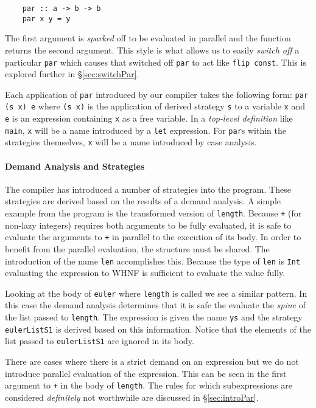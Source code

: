 \begin{verbatim}
    par :: a -> b -> b
    par x y = y
\end{verbatim}

The first argument is \emph{sparked} off to be evaluated in parallel and the
function returns the second argument. This style is what allows us to easily
\emph{switch off} a particular \verb-par- which causes that switched off
\verb-par- to act like \verb-flip const-. This is explored further in
\S\ref{sec:switchPar}.

Each application of \verb-par- introduced by our compiler takes the following
form: \verb-par (s x) e- where \verb-(s x)- is the application of derived
strategy \verb-s- to a variable \verb$x$ and \verb$e$ is an expression containing \verb$x$ as a
free variable.  In a \emph{top-level definition} like \verb-main-, \verb$x$ will be a
name introduced by a \verb-let- expression. For \verb-par-s within the
strategies themselves, \verb$x$ will be a name introduced by case analysis.

\paragraph{Demand Analysis and Strategies}

The compiler has introduced a number of strategies into the program. These
strategies are derived based on the results of a demand analysis. A simple
example from the program is the transformed version of \verb-length-. Because
\verb-+- (for non-lazy integers) requires both arguments to be fully evaluated, it is safe to 
evaluate the arguments to \verb-+- in parallel to the execution of its body.
In order to benefit from the parallel evaluation, the structure must be shared.
The introduction of the name \verb-len- accomplishes this. Because the type
of \verb-len- is \verb-Int- evaluating the expression to WHNF is sufficient to
evaluate the value fully. 

Looking at the body of \verb-euler- where \verb-length- is called we see a
similar pattern. In this case the demand analysis determines that it is
safe the evaluate the \emph{spine} of the list passed to \verb-length-.
The expression is given the name \verb-ys- and the strategy \verb-eulerListS1-
is derived based on this information. Notice that the elements of the list
passed to \verb-eulerListS1- are ignored in its body. 

There are cases where there is a strict demand on an expression but we
do not introduce parallel evaluation of the expression. This can be seen
in the first argument to \verb-+- in the body of \verb-length-. The rules
for which subexpressions are considered \emph{definitely} not worthwhile
are discussed in \S\ref{sec:introPar}.

